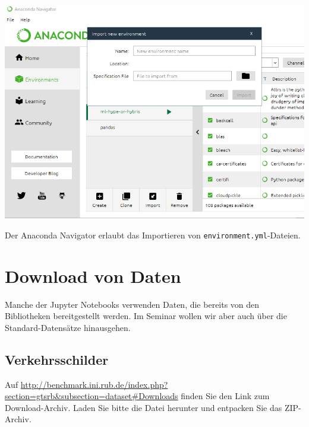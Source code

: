 \documentclass{tufte-handout}
\begin{document}
\begin{marginfigure}
  \includegraphics{anaconda-navigator}
  \caption{Der Anaconda Navigator erlaubt das Importieren von \texttt{environment.yml}-Dateien.}%
\label{fig:anaconda-navigator}
\end{marginfigure}




\section{Download von Daten}

Manche der Jupyter Notebooks verwenden Daten, die bereits von den Bibliotheken bereitgestellt werden.
Im Seminar wollen wir aber auch über die Standard-Datensätze hinausgehen.

\subsection{Verkehrsschilder}

Auf \url{http://benchmark.ini.rub.de/index.php?section=gtsrb&subsection=dataset#Downloads} finden Sie den Link zum Download-Archiv.
Laden Sie bitte die Datei \texttt{} herunter und entpacken Sie das ZIP-Archiv.



\end{document}
